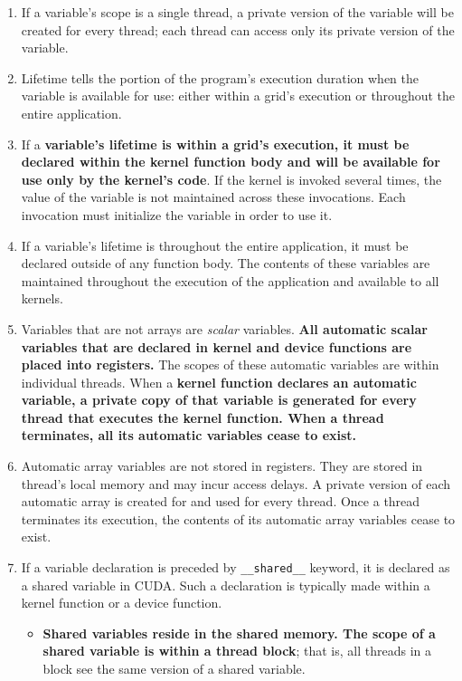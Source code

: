 \begin{enumerate}
      \item If a variable's scope is a single thread, a private version of the variable will be created for every thread; each thread can access only its private version of the variable.
      \item Lifetime tells the portion of the program's execution duration when the variable is available for use: either within a grid's execution or throughout the entire application.
      \item If a \textbf{variable's lifetime is within a grid's execution, it must be declared within the kernel function body and will be available for use only by the kernel's code}. If the kernel is invoked several times, the value of the variable is not maintained across these invocations. Each invocation must initialize the variable in order to use it.
      \item If a variable's lifetime is throughout the entire application, it must be declared outside of any function body. The contents of these variables are maintained throughout the execution of the application and available to all kernels.
      \item Variables that are not arrays are \textsl{scalar} variables. \textbf{All automatic scalar variables that are declared in kernel and device functions are placed into registers.} The scopes of these automatic variables are within individual threads. When a \textbf{kernel function declares an automatic variable, a private copy of that variable is generated for every thread that executes the kernel function. When a thread terminates, all its automatic variables cease to exist.}
      \item Automatic array variables are not stored in registers. They are stored in thread's local memory and may incur access delays. A private version of each automatic array is created for and used for every thread. Once a thread terminates its execution, the contents of its automatic array variables cease to exist.
      \item If a variable declaration is preceded by \texttt{\_\_shared\_\_} keyword, it is declared as a shared variable in CUDA. Such a declaration is typically made within a kernel function or a device function.
            \begin{itemize}
                  \item \textbf{Shared variables reside in the shared memory. The scope of a shared variable is within a thread block}; that is, all threads in a block see the same version of a shared variable.

\end{itemize}
\end{enumerate}
